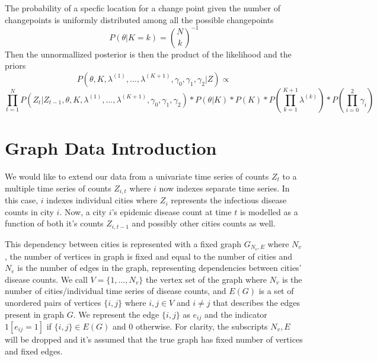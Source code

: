 \documentclass[]{article}
\numberwithin{equation}{section}
\begin{document}
The probability of a specfic location for a change point given the
number of changepoints is uniformly distributed among all the possible
changepoints \[P(\theta|K=k) = \binom{N}{k}^{-1}\] Then the
unnormallized posterior is then the product of the likelihood and the
priors
\[ P(\theta, K, \lambda^{(1)}, \dots, \lambda^{(K+1)}, \gamma_0, \gamma_1, \gamma_2|Z)  \propto \]
\[\prod_{t=1}^N P(Z_t|Z_{t-1},\theta, K, \lambda^{(1)}, \dots, \lambda^{(K+1)}, \gamma_0, \gamma_1, \gamma_2)*P(\theta|K)*P(K)*P(\prod_{k=1}^{K+1}\lambda^{(k)} )*P(\prod_{i=0}^2 \gamma_i)  \]

\hypertarget{graph-data-introduction}{%
\section{Graph Data Introduction}\label{graph-data-introduction}}

We would like to extend our data from a univariate time series of counts
\(Z_t\) to a multiple time series of counts \(Z_{i,t}\) where \(i\) now
indexes separate time series. In this case, \(i\) indexes individual
cities where \(Z_i\) represents the infectious disease counts in city
\(i\). Now, a city \(i\)'s epidemic disease count at time \(t\) is
modelled as a function of both it's counts \(Z_{i,t-1}\) and possibly
other cities counts as well.

This dependency between cities is represented with a fixed graph
\(G_{N_v, E}\) where \(N_v\), the number of vertices in graph is fixed
and equal to the number of cities and \(N_e\) is the number of edges in
the graph, representing dependencies between cities' disease counts. We
call \(V = \{1,\dots,N_v \}\) the vertex set of the graph where \(N_v\)
is the number of cities/individual time series of disease counts, and
\(E(G)\) is a set of unordered pairs of vertices \(\{i,j\}\) where
\(i,j \in V\) and \(i \neq j\) that describes the edges present in graph
\(G\). We represent the edge \(\{i,j\}\) as \(e_{ij}\) and the indicator
\(1[e_{ij}=1]\) if \(\{i,j\} \in E(G)\) and 0 otherwise. For clarity,
the subscripts \(N_v, E\) will be dropped and it's assumed that the true
graph has fixed number of vertices and fixed edges.
\end{document}
